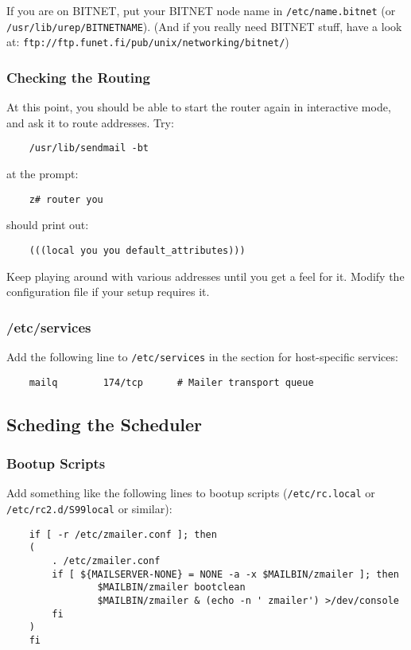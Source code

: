 If you are on BITNET, put your BITNET node name in {\tt /etc/name.bitnet}
(or {\tt /usr/lib/urep/BITNETNAME}). (And if you really need BITNET stuff, have a look at:
{\tt ftp://ftp.funet.fi/pub/unix/networking/bitnet/})




\subsubsection{Checking the Routing}

At this point, you should be able to start the router again in
interactive mode, and ask it to route addresses.  Try:
\begin{verbatim}
    /usr/lib/sendmail -bt
\end{verbatim}

at the prompt:
\begin{verbatim}
    z# router you
\end{verbatim}

should print out:
\begin{verbatim}
    (((local you you default_attributes)))
\end{verbatim}


Keep playing around with various addresses until you get a feel for it.
Modify the configuration file if your setup requires it.


\subsubsection{/etc/services}

Add the following line to {\tt /etc/services} in the section for
host-specific services:
\begin{verbatim}
    mailq        174/tcp      # Mailer transport queue
\end{verbatim}

\subsection{Scheding the Scheduler}


\subsubsection{Bootup Scripts}

Add something like the following lines to bootup scripts ({\tt /etc/rc.local}
or {\tt /etc/rc2.d/S99local} or similar):
\begin{verbatim}
    if [ -r /etc/zmailer.conf ]; then
    (
        . /etc/zmailer.conf
        if [ ${MAILSERVER-NONE} = NONE -a -x $MAILBIN/zmailer ]; then
                $MAILBIN/zmailer bootclean
                $MAILBIN/zmailer & (echo -n ' zmailer') >/dev/console
        fi
    )
    fi
\end{verbatim}

